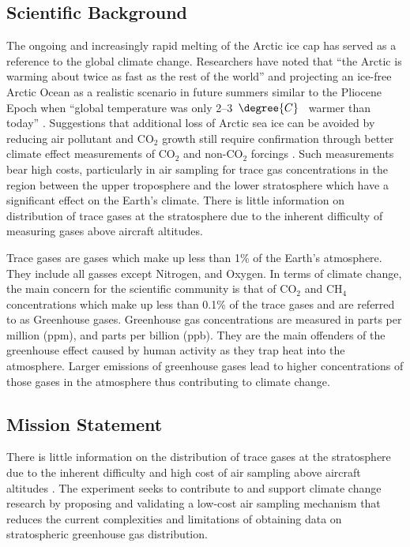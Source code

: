 \documentclass[a4paper,12pt,oneside]{article} %
\providecommand{\DIFaddbegin}{} %
\providecommand{\DIFaddend}{} %
\providecommand{\DIFdelbegin}{} %
\providecommand{\DIFdelend}{} %
\newcommand{\DIFscaledelfig}{0.5}
\newlength{\DIFdelgraphicswidth} %
\newlength{\DIFdelgraphicsheight} %
\newcommand{\DIFaddincludegraphics}[2][]{{\color{blue}\fbox{\DIFOincludegraphics[#1]{#2}}}} %
\newcommand{\DIFdelincludegraphics}[2][]{%
\sbox{\DIFdelgraphicsbox}{\DIFOincludegraphics[#1]{#2}}%
\settoboxwidth{\DIFdelgraphicswidth}{\DIFdelgraphicsbox} %
\settoboxtotalheight{\DIFdelgraphicsheight}{\DIFdelgraphicsbox} %
\scalebox{\DIFscaledelfig}{%
\parbox[b]{\DIFdelgraphicswidth}{\usebox{\DIFdelgraphicsbox}\\[-\baselineskip] \rule{\DIFdelgraphicswidth}{0em}}\llap{\resizebox{\DIFdelgraphicswidth}{\DIFdelgraphicsheight}{%
\setlength{\unitlength}{\DIFdelgraphicswidth}%
\begin{picture}(1,1)%
\thicklines\linethickness{2pt} %
{\color[rgb]{1,0,0}\put(0,0){\framebox(1,1){}}}%
{\color[rgb]{1,0,0}\put(0,0){\line( 1,1){1}}}%
{\color[rgb]{1,0,0}\put(0,1){\line(1,-1){1}}}%
\end{picture}%
}\hspace*{3pt}}} %
} %
\DeclareRobustCommand{\DIFaddbegin}{\DIFOaddbegin \let\includegraphics\DIFaddincludegraphics} %
\DeclareRobustCommand{\DIFaddend}{\DIFOaddend \let\includegraphics\DIFOincludegraphics} %
\DeclareRobustCommand{\DIFdelbegin}{\DIFOdelbegin \let\includegraphics\DIFdelincludegraphics} %
\DeclareRobustCommand{\DIFdelend}{\DIFOaddend \let\includegraphics\DIFOincludegraphics} %
\begin{document}
\subsection{Scientific Background}

The ongoing and increasingly rapid melting of the Arctic ice cap has served as a reference to the global climate change. Researchers have noted that \enquote{the Arctic is warming about twice as fast as the rest of the world} \cite{Perkins} and projecting an ice-free Arctic Ocean as a realistic scenario in future summers similar to the Pliocene Epoch when \DIFdelbegin %
\DIFdelend \DIFaddbegin \enquote{global temperature was only 2–3\mbox{%
$\degree{C}$
}%
warmer than today} \DIFaddend \cite{Trace}. Suggestions that additional loss of Arctic sea ice can be avoided by reducing air pollutant and CO$_{2}$ growth still require confirmation through better climate effect measurements of CO$_{2}$ and non-CO$_{2}$ forcings \cite{Trace}. Such measurements bear high costs, particularly in air sampling for trace gas concentrations in the region between the upper troposphere and the lower stratosphere which have a significant effect on the Earth's climate. There is little information on distribution of trace gases at the stratosphere due to the inherent difficulty of measuring gases above aircraft altitudes.

Trace gases are gases which make up less than 1\% of the Earth's atmosphere. They include all gasses except Nitrogen, and Oxygen. In terms of climate change, the main concern for the scientific community is that of CO$_2$ and CH$_4$ concentrations which make up less than 0.1\% of the trace gases and are referred to as Greenhouse gases. Greenhouse gas concentrations are measured in parts per million (ppm), and parts per billion (ppb). They are the main offenders of the greenhouse effect caused by human activity as they trap heat into the atmosphere. Larger emissions of greenhouse gases lead to higher concentrations of those gases in the atmosphere thus contributing to climate change.

\subsection{Mission Statement}

There is little information on the distribution of trace gases at the stratosphere due to the inherent difficulty and high cost of air sampling above aircraft altitudes \cite{Trace}. The experiment seeks to contribute to and support climate change research by proposing and validating a low-cost air sampling mechanism that reduces the current complexities and limitations of obtaining data on stratospheric greenhouse gas distribution.
\pagebreak
\end{document}
